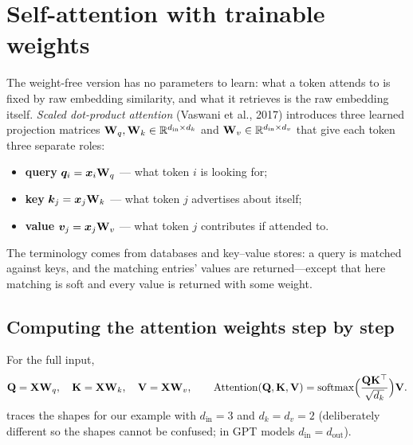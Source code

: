 \section{Self-attention with trainable weights}\label{sec:attention:trainable}

The weight-free version has no parameters to learn: what a token attends to is fixed by raw
embedding similarity, and what it retrieves is the raw embedding itself. \emph{Scaled dot-product
attention} (Vaswani et al., 2017) introduces three learned projection matrices
$\mathbf{W}_q,\mathbf{W}_k\in\mathbb{R}^{d_{\text{in}}\times d_k}$ and $\mathbf{W}_v\in\mathbb{R}^{d_{\text{in}}\times d_v}$ that
give each token three separate roles:
\begin{itemize}
  \item \textbf{query} $\bm{q}_i=\bm{x}_i\mathbf{W}_q$ --- what token $i$ is looking for;
  \item \textbf{key} $\bm{k}_j=\bm{x}_j\mathbf{W}_k$ --- what token $j$ advertises about itself;
  \item \textbf{value} $\bm{v}_j=\bm{x}_j\mathbf{W}_v$ --- what token $j$ contributes if attended to.
\end{itemize}
The terminology comes from databases and key--value stores: a query is matched against keys, and
the matching entries' values are returned---except that here matching is soft and every value is
returned with some weight.

\subsection{Computing the attention weights step by step}
For the full input,
\begin{equation}
\mathbf{Q}=\mathbf{X}\mathbf{W}_q,\quad \mathbf{K}=\mathbf{X}\mathbf{W}_k,\quad \mathbf{V}=\mathbf{X}\mathbf{W}_v,\qquad
\operatorname{Attention}(\mathbf{Q},\mathbf{K},\mathbf{V}) = \operatorname{softmax}\!\Big(\frac{\mathbf{Q}\mathbf{K}^\top}{\sqrt{d_k}}\Big)\mathbf{V}.
\label{eq:attention:sdpa}
\end{equation}
 traces the shapes for our example with $d_{\text{in}}=3$ and
$d_k=d_v=2$ (deliberately different so the shapes cannot be confused; in GPT models
$d_{\text{in}}=d_{\text{out}}$).


